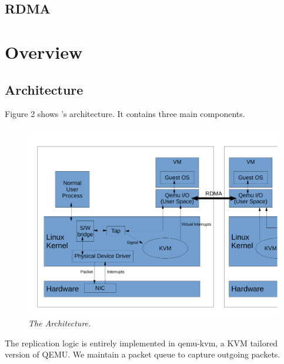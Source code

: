 \subsection{RDMA} \label{sec:rdma}

\section{\xxx Overview} \label{sec:overview}

\subsection{Architecture} \label{sec:arch}

Figure 2 shows \xxx's architecture. It contains three main components.

\begin{figure}[t]
\centering
\includegraphics[width=.47\textwidth]{figures/arch}
\vspace{-.2in}
\caption{{\em The \xxx Architecture.}} \label{fig:arc}
\vspace{.05in}
\end{figure}

The replication logic is entirely implemented in qemu-kvm, a KVM tailored version of QEMU.
We maintain a packet queue to capture outgoing packets.
